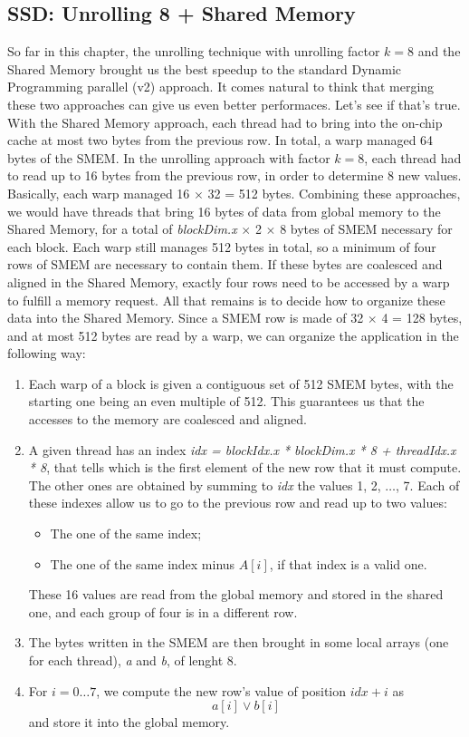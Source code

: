 \documentclass[12pt]{extarticle}
\begin{document}
\subsection{SSD: Unrolling 8 + Shared Memory}
So far in this chapter, the unrolling technique with unrolling factor $k = 8$ and the Shared Memory brought us the best speedup to the standard Dynamic Programming parallel (v2) approach. It comes natural to think that merging these two approaches can give us even better performaces. Let's see if that's true.\newline
With the Shared Memory approach, each thread had to bring into the on-chip cache at most two bytes from the previous row. In total, a warp managed 64 bytes of the SMEM.\newline
In the unrolling approach with factor $k = 8$, each thread had to read up to 16 bytes from the previous row, in order to determine 8 new values. Basically, each warp managed 16 $\times$ 32 = 512 bytes.\newline
Combining these approaches, we would have threads that bring 16 bytes of data from global memory to the Shared Memory, for a total of \emph{blockDim.x} $\times$ 2 $\times$ 8 bytes of SMEM necessary for each block. Each warp still manages 512 bytes in total, so a minimum of four rows of SMEM are necessary to contain them. If these bytes are coalesced and aligned in the Shared Memory, exactly four rows need to be accessed by a warp to fulfill a memory request.\newline
All that remains is to decide how to organize these data into the Shared Memory. Since a SMEM row is made of 32 $\times$ 4 = 128 bytes, and at most 512 bytes are read by a warp, we can organize the application in the following way:
\begin{enumerate}
    \item Each warp of a block is given a contiguous set of 512 SMEM bytes, with the starting one being an even multiple of 512. This guarantees us that the accesses to the memory are coalesced and aligned.
    \item A given thread has an index \emph{idx = blockIdx.x * blockDim.x * 8 + threadIdx.x * 8}, that tells which is the first element of the new row that it must compute. The other ones are obtained by summing to \emph{idx} the values 1, 2, $\dots$, 7. Each of these indexes allow us to go to the previous row and read up to two values:
    \begin{itemize}
        \item The one of the same index;
        \item The one of the same index minus $A[i]$, if that index is a valid one.
    \end{itemize}
    These 16 values are read from the global memory and stored in the shared one, and each group of four is in a different row.
    \item The bytes written in the SMEM are then brought in some local arrays (one for each thread), \emph{a} and \emph{b}, of lenght 8.
    \item For $i = 0 \dots 7$, we compute the new row's value of position $idx + i$ as
    \[a[i] \lor b[i]\]
    and store it into the global memory.
\end{enumerate}
\end{document}
